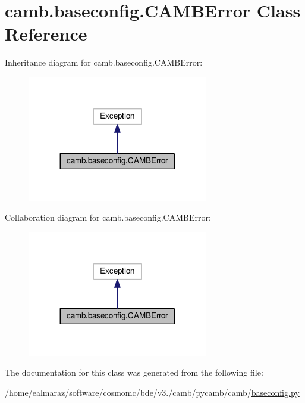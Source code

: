 \hypertarget{classcamb_1_1baseconfig_1_1CAMBError}{}\section{camb.\+baseconfig.\+C\+A\+M\+B\+Error Class Reference}
\label{classcamb_1_1baseconfig_1_1CAMBError}


Inheritance diagram for camb.\+baseconfig.\+C\+A\+M\+B\+Error\+:
\nopagebreak
\begin{figure}[H]
\begin{center}
\leavevmode
\includegraphics[width=224pt]{classcamb_1_1baseconfig_1_1CAMBError__inherit__graph}
\end{center}
\end{figure}


Collaboration diagram for camb.\+baseconfig.\+C\+A\+M\+B\+Error\+:
\nopagebreak
\begin{figure}[H]
\begin{center}
\leavevmode
\includegraphics[width=224pt]{classcamb_1_1baseconfig_1_1CAMBError__coll__graph}
\end{center}
\end{figure}


The documentation for this class was generated from the following file\+:\begin{DoxyCompactItemize}
\item 
/home/ealmaraz/software/cosmomc/bde/v3./camb/pycamb/camb/\mbox{\hyperlink{baseconfig_8py}{baseconfig.\+py}}\end{DoxyCompactItemize}
